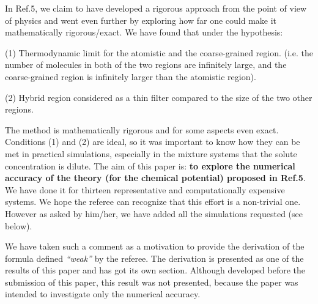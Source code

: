 \documentclass[12pt]{article}
\newcommand{\recheck}[1]{{\color{red} #1}}
\begin{document}
In Ref.5, we claim to have developed a rigorous approach from the
point of view of physics and went even further by exploring how far
one could make it mathematically rigorous/exact. We have found that
under the hypothesis:

(1) Thermodynamic limit for the {atomistic and the coarse-grained region. (i.e. the number of molecules in both of the two
  regions are infinitely large, and the coarse-grained region is infinitely larger than the atomistic region)}.

(2) Hybrid region considered as a thin filter compared to the size of the two other regions.

The method is mathematically rigorous and for some aspects even
exact. Conditions (1) and (2) are ideal, so it was important to know
how they can be met in {practical simulations, especially in
the mixture systems that the solute concentration is dilute.} The aim of this paper is: {\bf to
  explore the numerical accuracy of the theory (for the chemical
  potential) proposed in Ref.5}.  We have done it for thirteen
representative and computationally expensive systems.  We hope the
referee can recognize that this effort is a non-trivial one. However
as asked by him/her, we have added all the simulations requested (see
below).

{\color{blue}{\it On the other hand, the paper lacks important pieces of information and many incomplete statements and definitions (see below). There is also a theoretical
    weakness in the sense that the main equation used to evaluate the chem. potential seems to be derived in an ad hoc fashion, and ``proven numerically'', as the authors wrote. It is not easy to rely on an equation/method which lacks a solid theoretical background (mostly in statistical physics)}}

We have taken such a comment as a motivation to {provide the} derivation of the formula defined {\it ``weak''} by the referee. The derivation is presented as one of the results of this paper and has got its own section.
Although developed before the submission of this paper, this result was not presented, because the paper was intended to investigate only the numerical accuracy.
\end{document}
